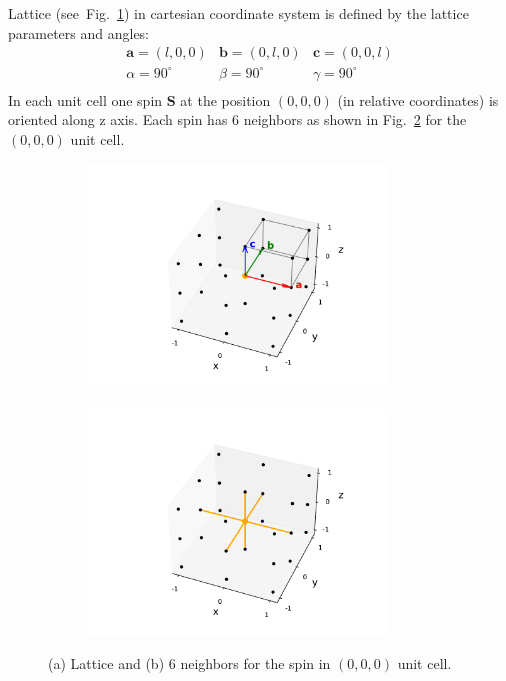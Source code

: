 \documentclass[a4paper,12pt]{article}
\begin{document}
        Lattice (see~Fig.~\ref{fig:lattice}) in cartesian coordinate system is defined by the lattice parameters and angles:
        \begin{equation}
            \begin{matrix}
                \mathbf{a} = (l, 0, 0) & \mathbf{b} = (0, l, 0) & \mathbf{c} = (0, 0, l) \\
                \alpha = 90^{\circ} & \beta = 90^{\circ} & \gamma = 90^{\circ} \\
            \end{matrix}
        \end{equation}
        In each unit cell one spin $\mathbf{S}$ at the position $(0, 0, 0)$ (in relative coordinates) is oriented along z axis.
        Each spin has 6 neighbors as shown in Fig.~\ref{fig:lattice-neighbors} for the $(0, 0, 0)$ unit cell.

        \begin{figure}[H]
            \centering
            \begin{subfigure}[b]{0.49\textwidth}
                \centering
                \includegraphics[height=6cm]{lattice.pdf}
                \caption{}
            \label{fig:lattice}
            \end{subfigure}
            \hfill
            \begin{subfigure}[b]{0.49\textwidth}
                \centering
                \includegraphics[height=6cm]{lattice-neighbors.pdf}
            \caption{}
            \label{fig:lattice-neighbors}
            \end{subfigure}
            \hfill
            \caption{(a) Lattice and (b) 6 neighbors for the spin in $(0, 0, 0)$ unit cell.}
            \label{fig:lattice-both}
        \end{figure}
\end{document}
